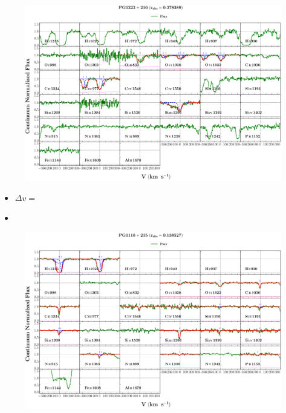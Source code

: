 \documentclass[12pt]{report}
\begin{document}
\begin{landscape}

    \begin{figure}
        \centering
        \vspace{-20mm}
        \hspace*{-35mm}
        \includegraphics[width=1.25\linewidth]{sys_plots_full/PG1222+216_z=0.378389_sys_plot_full.png}
    \end{figure}
    
\end{landscape}


\begin{itemize}
    \item $\Delta v = $
    \item 
\end{itemize}


\begin{landscape}

    \begin{figure}
        \centering
        \vspace{-20mm}
        \hspace*{-35mm}
        \includegraphics[width=1.25\linewidth]{sys_plots_full/PG1116+215_z=0.138527_sys_plot_full.png}
    \end{figure}
    
\end{landscape}
\end{document}
